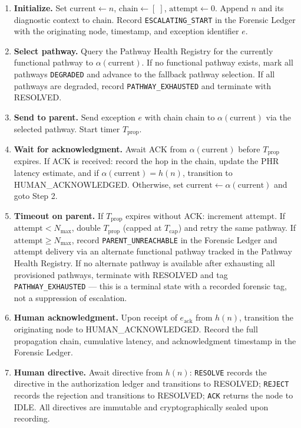 \begin{enumerate}
    \item \textbf{Initialize.} Set $\text{current} \leftarrow n$, $\text{chain} \leftarrow [\;]$, $\text{attempt} \leftarrow 0$. Append $n$ and its diagnostic context to $\text{chain}$. Record \texttt{ESCALATING\_START} in the Forensic Ledger with the originating node, timestamp, and exception identifier $e$.

    \item \textbf{Select pathway.} Query the Pathway Health Registry for the currently functional pathway to $\alpha(\text{current})$. If no functional pathway exists, mark all pathways \texttt{DEGRADED} and advance to the fallback pathway selection. If all pathways are degraded, record \texttt{PATHWAY\_EXHAUSTED} and terminate with RESOLVED.

    \item \textbf{Send to parent.} Send exception $e$ with chain $\text{chain}$ to $\alpha(\text{current})$ via the selected pathway. Start timer $T_{\text{prop}}$.

    \item \textbf{Wait for acknowledgment.} Await ACK from $\alpha(\text{current})$ before $T_{\text{prop}}$ expires. If ACK is received: record the hop in the chain, update the PHR latency estimate, and if $\alpha(\text{current}) = h(n)$, transition to HUMAN\_ACKNOWLEDGED. Otherwise, set $\text{current} \leftarrow \alpha(\text{current})$ and goto Step 2.

    \item \textbf{Timeout on parent.} If $T_{\text{prop}}$ expires without ACK: increment $\text{attempt}$. If $\text{attempt} < N_{\max}$, double $T_{\text{prop}}$ (capped at $T_{\text{cap}}$) and retry the same pathway. If $\text{attempt} \geq N_{\max}$, record \texttt{PARENT\_UNREACHABLE} in the Forensic Ledger and attempt delivery via an alternate functional pathway tracked in the Pathway Health Registry. If no alternate pathway is available after exhausting all provisioned pathways, terminate with RESOLVED and tag \texttt{PATHWAY\_EXHAUSTED} — this is a terminal state with a recorded forensic tag, not a suppression of escalation.

    \item \textbf{Human acknowledgment.} Upon receipt of $e_{\text{ack}}$ from $h(n)$, transition the originating node to HUMAN\_ACKNOWLEDGED. Record the full propagation chain, cumulative latency, and acknowledgment timestamp in the Forensic Ledger.

    \item \textbf{Human directive.} Await directive from $h(n)$: \texttt{RESOLVE} records the directive in the authorization ledger and transitions to RESOLVED; \texttt{REJECT} records the rejection and transitions to RESOLVED; \texttt{ACK} returns the node to IDLE. All directives are immutable and cryptographically sealed upon recording.
\end{enumerate}

